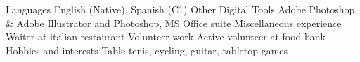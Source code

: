 %
\iftrue%
\miscSkillRow%
        {Languages}%
        {%
        English (Native), Spanish (C1)%
        }%
\myhline%
\fi%
%
\iftrue%
\miscSkillRow%
        {Other Digital Tools}%
        {%
        Adobe Photoshop \& Adobe Illustrator and Photoshop, MS Office suite%
        }%
\myhline%
\fi%
%
\iftrue%
\miscSkillRow%
        {Miscellaneous experience}%
        {%
        Waiter at italian restaurant%
        }%
\myhline%
\fi%
%
\iftrue%
\miscSkillRow%
        {Volunteer work}%
        {%
        Active volunteer at food bank%
        }%
\myhline%
\fi%
%
\iftrue%
\miscSkillRow%
        {Hobbies and interests}%
        {%
        Table tenis, cycling, guitar, tabletop games%
        }%
\myhline%
\fi%
%